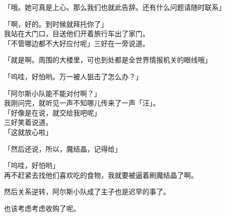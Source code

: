 「哦。她可真是上心。那么我们也就此告辞。还有什么问题请随时联系」

「啊，好的。到时候就拜托你了」\\

我站在大门口，目送他们开着旅行车出了家门。\\

「不管哪边都不大好应付呢」三好在一旁说道。

「就是啊。周围的大楼里，可也到处都是全世界情报机关的眼线哦」

「呜哇，好怕哟。万一被人狙击了怎么办？」

「阿尔斯小队能不能对付啊？」\\

我刚问完，就听见一声不知哪儿传来了一声「汪」。\\

「好像是在说，就交给我吧呢」\\

三好笑着说道。\\

「这就放心啦」

「然后还说，所以，魔结晶，记得给」

「呜哇，好怕哟」\\

再不赶紧去找他们喜欢吃的食物，我就要被逼着刷魔结晶了啊。

然后关系逆转，阿尔斯小队成了主子也是迟早的事了。

也该考虑考虑收购了呢。\\

